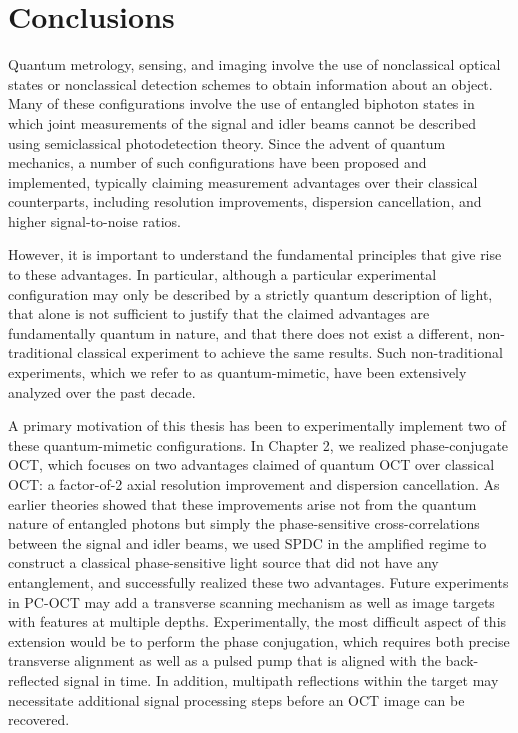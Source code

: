 \chapter{Conclusions}

Quantum metrology, sensing, and imaging involve the use of nonclassical optical states or nonclassical detection schemes to obtain information about an object. Many of these configurations involve the use of entangled biphoton states in which joint measurements of the signal and idler beams cannot be described using semiclassical photodetection theory. Since the advent of quantum mechanics, a number of such configurations have been proposed and implemented, typically claiming measurement advantages over their classical counterparts, including resolution improvements, dispersion cancellation, and higher signal-to-noise ratios.

However, it is important to understand the fundamental principles that give rise to these advantages. In particular, although a particular experimental configuration may only be described by a strictly quantum description of light, that alone is not sufficient to justify that the claimed advantages are fundamentally quantum in nature, and that there does not exist a different, non-traditional classical experiment to achieve the same results. Such non-traditional experiments, which we refer to as quantum-mimetic, have been extensively analyzed over the past decade.

A primary motivation of this thesis has been to experimentally implement two of these quantum-mimetic configurations. In Chapter 2, we realized phase-conjugate OCT, which focuses on two advantages claimed of quantum OCT over classical OCT: a factor-of-2 axial resolution improvement and dispersion cancellation. As earlier theories showed that these improvements arise not from the quantum nature of entangled photons but simply the phase-sensitive cross-correlations between the signal and idler beams, we used SPDC in the amplified regime to construct a classical phase-sensitive light source that did not have any entanglement, and successfully realized these two advantages. Future experiments in PC-OCT may add a transverse scanning mechanism as well as image targets with features at multiple depths. Experimentally, the most difficult aspect of this extension would be to perform the phase conjugation, which requires both precise transverse alignment as well as a pulsed pump that is aligned with the back-reflected signal in time. In addition, multipath reflections within the target may necessitate additional signal processing steps before an OCT image can be recovered.

